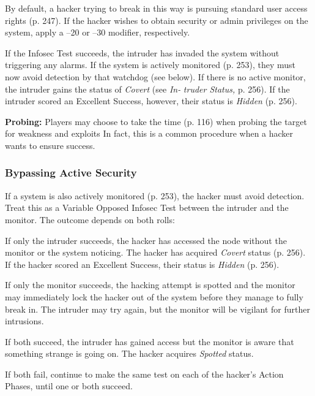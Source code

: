 By default, a hacker trying to break in this way is 
pursuing standard user access rights (p. 247). If the 
hacker wishes to obtain security or admin privileges on 
the system, apply a –20 or –30 modifier, respectively.

If the Infosec Test succeeds, the intruder has invaded 
the system without triggering any alarms. If the system is 
actively monitored (p. 253), they must now avoid detection
by that watchdog (see below). If there is no active
monitor, the intruder gains the status of \textit{Covert} (see \textit{In-}
\textit{truder Status,} p. 256). If the intruder scored an Excellent 
Success, however, their status is \textit{Hidden }(p. 256).

\textbf{Probing:} Players may choose to take the time (p. 
116) when probing the target for weakness and exploits
In fact, this is a common procedure when a
hacker wants to ensure success.

\subsubsection{Bypassing Active Security}

If a system is also actively monitored (p. 253), the 
hacker must avoid detection. Treat this as a Variable 
Opposed Infosec Test between the intruder and the 
monitor. The outcome depends on both rolls:

If only the intruder succeeds, the hacker has accessed
the node without the monitor or the system
noticing. The hacker has acquired \textit{Covert} status (p. 
256). If the hacker scored an Excellent Success, their 
status is \textit{Hidden }(p. 256).

If only the monitor succeeds, the hacking attempt 
is spotted and the monitor may immediately lock the 
hacker out of the system before they manage to fully 
break in. The intruder may try again, but the monitor 
will be vigilant for further intrusions.

If both succeed, the intruder has gained access but 
the monitor is aware that something strange is going 
on. The hacker acquires \textit{Spotted} status.

If both fail, continue to make the same test on each 
of the hacker's Action Phases, until one or both succeed.

